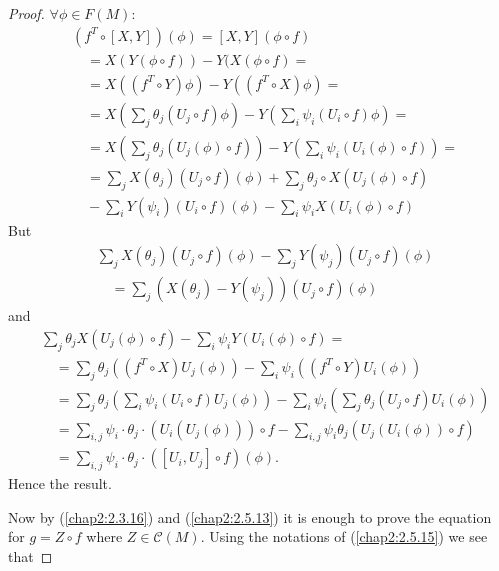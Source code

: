 \begin{proof}
$\forall \phi\in F(M)$:
\begin{align*}
& (f^{T}\circ[X,Y])(\phi)=[X,Y](\phi\circ f)\\
&\quad =X(Y(\phi\circ f))-Y(X(\phi\circ f)=\\
&\quad =X((f^{T}\circ Y)\phi)-Y((f^{T}\circ X)\phi)=\\
&\quad =X(\sum_{j}\theta_{j}(U_{j}\circ
  f)\phi)-Y(\sum_{i}\psi_{i}(U_{i}\circ f)\phi)=\\ 
&\quad =X(\sum_{j}\theta_{j}(U_{j}(\phi)\circ
  f))-Y(\sum_{i}\psi_{i}(U_{i}(\phi)\circ f))=\\ 
&\quad =\sum_{j}X(\theta_{j})(U_{j}\circ
  f)(\phi)+\sum_{j}\theta_{j}\circ X(U_{j}(\phi)\circ f)\\ 
&\quad -\sum_{i}Y(\psi_{i})(U_{i}\circ
  f)(\phi)-\sum_{i}\psi_{i}X(U_{i}(\phi)\circ f) 
\end{align*}
But\pageoriginale
\begin{align*}
&\sum_{j}X(\theta_{j})(U_{j}\circ f)(\phi)-\sum_{j}Y(\psi_{j})(U_{j}\circ f)(\phi)\\
&\quad =\sum_{j}(X(\theta_{j})-Y(\psi_{j}))(U_{j}\circ f)(\phi)
\end{align*}
and
\begin{align*}
& \sum_{j}\theta_{j}X(U_{j}(\phi)\circ
  f)-\sum_{i}\psi_{i}Y(U_{i}(\phi)\circ f)=\\ 
&\quad =\sum_{j}\theta_{j}((f^{T}\circ
  X)U_{j}(\phi))-\sum_{i}\psi_{i}((f^{T}\circ Y)U_{i}(\phi))\\ 
&\quad =\sum_{j}\theta_{j}(\sum_{i}\psi_{i}(U_{i}\circ
  f)U_{j}(\phi))-\sum_{i}\psi_{i}(\sum_{j}\theta_{j}(U_{j}\circ
  f)U_{i}(\phi))\\ 
&\quad =\sum_{i,j}\psi_{i}\cdot\theta_{j}\cdot
  (U_{i}(U_{j}(\phi)))\circ
  f-\sum_{i,j}\psi_{i}\theta_{j}(U_{j}(U_{i}(\phi))\circ f)\\ 
&\quad =\sum_{i,j}\psi_{i}\cdot \theta_{j}\cdot ([U_{i},U_{j}]\circ
  f)(\phi). 
\end{align*}
Hence the result.

Now by (\ref{chap2:2.3.16}) and (\ref{chap2:2.5.13}) it is enough to prove
the equation for $g=Z\circ f$ where $Z\in\mathscr{C}(M)$. Using the
notations of (\ref{chap2:2.5.15}) we see that 

\setcounter{subsection}{14}

\end{proof}
